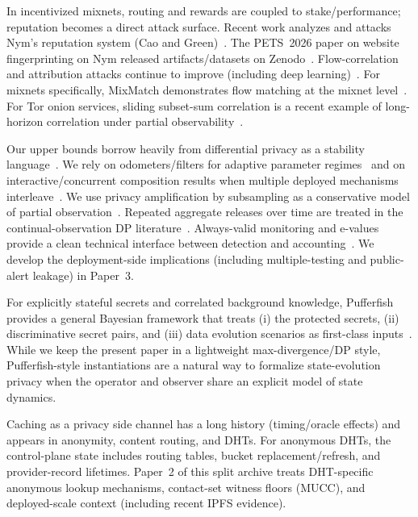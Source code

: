 \documentclass[11pt]{article}
\begin{document}
In incentivized mixnets, routing and rewards are coupled to stake/performance; reputation becomes a direct attack surface.
Recent work analyzes and attacks Nym's reputation system (Cao and Green)~\cite{cao2026nymrep}. The PETS~2026 paper on website fingerprinting on Nym released artifacts/datasets on Zenodo~\cite{jolles2025wf4nym_zenodo}.
Flow-correlation and attribution attacks continue to improve (including deep learning)~\cite{nasr2018deepcorr,oh2022deepcoffea,singh2025revealnet}.
For mixnets specifically, MixMatch demonstrates flow matching at the mixnet level~\cite{oldenburg2024mixmatch}.
For Tor onion services, sliding subset-sum correlation is a recent example of long-horizon correlation under partial observability~\cite{lopes2024sumo}.

Our upper bounds borrow heavily from differential privacy as a stability language~\cite{dworkroth2014foundations}.
We rely on odometers/filters for adaptive parameter regimes~\cite{rogers2016odometers} and on interactive/concurrent composition results when multiple deployed mechanisms interleave~\cite{vadhanwang2021concurrentdp,zhang2023concurrentinteractive}.
We use privacy amplification by subsampling as a conservative model of partial observation~\cite{balle2018subsampling}.
Repeated aggregate releases over time are treated in the continual-observation DP literature~\cite{dwork2010continual,chan2010continual}.
Always-valid monitoring and e-values provide a clean technical interface between detection and accounting~\cite{howard2021confseq,ramdas2024evalues}. We develop the deployment-side implications (including multiple-testing and public-alert leakage) in Paper~3.

For explicitly stateful secrets and correlated background knowledge, Pufferfish provides a general Bayesian framework that treats (i) the protected secrets, (ii) discriminative secret pairs, and (iii) data evolution scenarios as first-class inputs~\cite{kifer2014pufferfish}.
While we keep the present paper in a lightweight max-divergence/DP style, Pufferfish-style instantiations are a natural way to formalize state-evolution privacy when the operator and observer share an explicit model of state dynamics.

Caching as a privacy side channel has a long history (timing/oracle effects) and appears in anonymity, content routing, and DHTs.
For anonymous DHTs, the control-plane state includes routing tables, bucket replacement/refresh, and provider-record lifetimes.
Paper~2 of this split archive treats DHT-specific anonymous lookup mechanisms, contact-set witness floors (MUCC), and deployed-scale context (including recent IPFS evidence).
\end{document}
